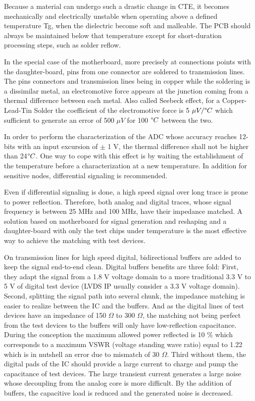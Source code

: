 Because a material can undergo such a drastic change in CTE, it becomes mechanically and electrically unstable when operating above a defined temperature Tg, when the dielectric become soft and malleable. The PCB should always be maintained below that temperature except for short-duration processing steps, such as solder reflow.

In the special case of the motherboard, more precisely at connections points with the daughter-board, pins from one connector are soldered to transmission lines. The pins connectors and transmission lines being in copper while the soldering is a dissimilar metal, an electromotive force appears at the junction coming from a thermal difference between each metal. Also called Seebeck effect, for a Copper-Lead-Tin Solder the coefficient of the electromotive force is 5 \(\mu V/\degree C \) which sufficient to generate an error of 500 \(\mu V\) for 100 \(\degree C\) between the two.

In order to perform the characterization of the ADC whose accuracy reaches 12-bits with an input excursion of \(\pm \) 1 V, the thermal difference shall not be higher than 24\(\degree C\). One way to cope with this effect is by waiting the establishment of the temperature before a characterization at a new temperature. In addition for sensitive nodes, differential signaling is recommended.

Even if differential signaling is done, a high speed signal over long trace is prone to power reflection. Therefore, both analog and digital traces, whose signal frequency is between 25 MHz and 100 MHz, have their impedance matched. A solution based on motherboard for signal generation and reshaping and a daughter-board with only the test chips under temperature is the most effective way to achieve the matching with test devices.

On transmission lines for high speed digital, bidirectional buffers are added to keep the signal end-to-end clean. Digital buffers benefits are three fold: First, they adapt the signal from a 1.8 V voltage domain to a more traditional 3.3 V to 5 V of digital test device (LVDS IP usually consider a 3.3 V voltage domain). Second, splitting the signal path into several chunk, the impedance matching is easier to realize between the IC and the buffers. And as the digital lines of test devices have an impedance of 150 \(\Omega \) to 300 \(\Omega \), the matching not being perfect from the test devices to the buffers will only have low-reflection capacitance. During the conception the maximum allowed power reflected is 10 \% which corresponds to a maximum VSWR (voltage standing wave ratio) equal to 1.22 which is in nutshell an error due to mismatch of 30 \(\Omega \). Third without them, the digital pads of the IC should provide a large current to charge and pump the capacitance of test devices. The large transient current generates a large noise whose decoupling from the analog core is more difficult. By the addition of buffers, the capacitive load is reduced and the generated noise is decreased.

